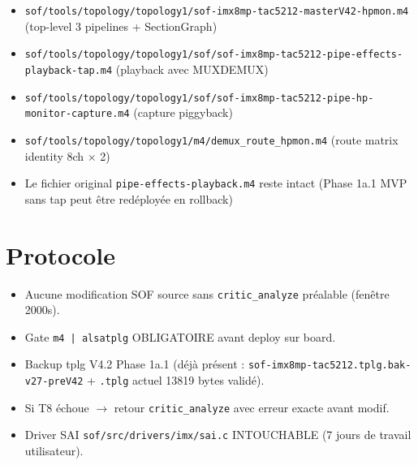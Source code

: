 \documentclass[11pt,a4paper]{article}
\begin{document}
\begin{itemize}[leftmargin=*, itemsep=1pt]
  \item \texttt{sof/tools/topology/topology1/sof-imx8mp-tac5212-masterV42-hpmon.m4} (top-level 3 pipelines + SectionGraph)
  \item \texttt{sof/tools/topology/topology1/sof/sof-imx8mp-tac5212-pipe-effects-playback-tap.m4} (playback avec MUXDEMUX)
  \item \texttt{sof/tools/topology/topology1/sof/sof-imx8mp-tac5212-pipe-hp-monitor-capture.m4} (capture piggyback)
  \item \texttt{sof/tools/topology/topology1/m4/demux\_route\_hpmon.m4} (route matrix identity 8ch $\times$ 2)
  \item Le fichier original \texttt{pipe-effects-playback.m4} reste intact (Phase 1a.1 MVP sans tap peut être redéployée en rollback)
\end{itemize}

\section{Protocole}

\begin{itemize}[leftmargin=*, itemsep=1pt]
  \item Aucune modification SOF source sans \texttt{critic\_analyze} préalable (fenêtre 2000s).
  \item Gate \texttt{m4 | alsatplg} OBLIGATOIRE avant deploy sur board.
  \item Backup tplg V4.2 Phase 1a.1 (déjà présent : \texttt{sof-imx8mp-tac5212.tplg.bak-v27-preV42} + \texttt{.tplg} actuel 13819 bytes validé).
  \item Si T8 échoue $\to$ retour \texttt{critic\_analyze} avec erreur exacte avant modif.
  \item Driver SAI \texttt{sof/src/drivers/imx/sai.c} INTOUCHABLE (7 jours de travail utilisateur).
\end{itemize}
\end{document}
